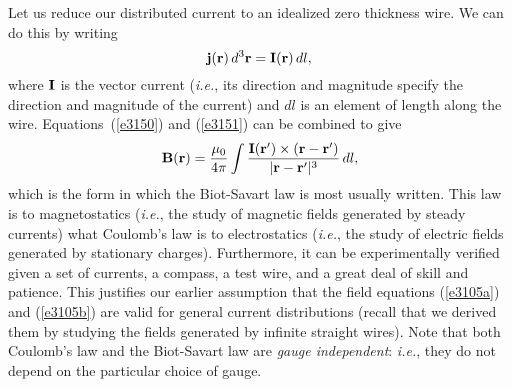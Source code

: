 Let us reduce  our  distributed  current  to 
an idealized zero thickness wire. We can do this by writing
\begin{equation}
{\bf j}({\bf r})\,d^3{\bf r} = {\bf I}({\bf r}) \,dl,\label{e3151}
\end{equation}
where ${\bf I}$ is the vector current ({\em i.e.}, its direction and magnitude specify
the direction and magnitude of the current) and
$dl$ is an element of length along the wire. Equations~(\ref{e3150}) and (\ref{e3151}) can
be combined to give 
\begin{equation}
{\bf B} ({\bf r}) = \frac{\mu_0}{4\pi} \int
\frac{{\bf I}({\bf r}')\times
({\bf r} - {\bf r}')}{|{\bf r} - {\bf r}'|^3}\,dl,\label{e3.152}
\end{equation}
which is the form in which the Biot-Savart law is most usually written. 
This law is to magnetostatics ({\em i.e.}, the study of magnetic
fields generated by steady currents) what Coulomb's law is to electrostatics
({\em i.e.}, the study of electric fields generated by stationary charges). Furthermore,
it can be experimentally verified given a set of currents, a
compass, a test wire, and a great deal of skill and patience. This
justifies  our
earlier assumption that the field equations (\ref{e3105a}) and (\ref{e3105b}) are valid for general
 current distributions (recall that we derived them by studying the  fields
generated by infinite straight wires). Note that both Coulomb's law and
the Biot-Savart law are {\em gauge independent}: {\em i.e.}, they do not depend on the 
particular choice of  gauge.

